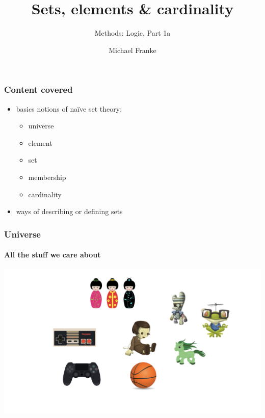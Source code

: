 \documentclass[fleqn,10pt,serif,xcolor=svgnames,xcolor=table,aspectratio=169,handout]{beamer}
\title{Sets, elements \& cardinality}
\subtitle{Methods: Logic, Part 1a}
\author{Michael Franke}
\date{}
\begin{document}

\abovedisplayskip=3pt
\abovedisplayshortskip=3pt

\belowdisplayskip=3pt
\belowdisplayshortskip=3pt

\begin{frame}
  \maketitle
\end{frame}

\begin{frame}
  \frametitle{Content covered}

  \begin{itemize}
    \item basics notions of na\"{i}ve set theory:
            \begin{itemize}
              \item universe
              \item element
              \item set
              \item membership
              \item cardinality
            \end{itemize}
    \item ways of describing or defining sets
  \end{itemize}
\end{frame}

\begin{frame}
  \frametitle{Universe}
  \framesubtitle{All the stuff we care about}

  \begin{center}
    \includegraphics[width=\textwidth]{01a-sets-elements-cardinality/01a-sets-elements-cardinality-001.jpeg}
  \end{center}
\end{frame}
\end{document}
